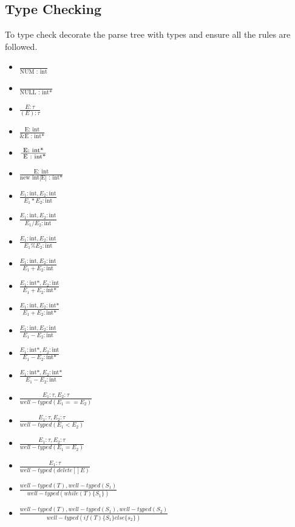 \documentclass{article}
\begin{document}
\subsection*{Type Checking}
To type check decorate the parse tree with types and ensure all the rules are followed. 
\begin{itemize}
\item \(\frac{}{\text{NUM : int}}\)
\item \(\frac{}{\text{NULL : int*}}\)
\item \(\frac{E : \tau}{(E) : \tau}\)
\item \(\frac{\text{E: int}}{\text{\& E : int*}}\)
\item \(\frac{\text{E: int*}}{\text{\* E : int*}}\)
\item \(\frac{\text{E: int}}{\text{new int[E] : int*}}\)
\item \(\frac{E_1 : \text{int}, E_2 : \text{int}}{E_1 * E_2 : \text{int}}\)
\item \(\frac{E_1 : \text{int}, E_2 : \text{int}}{E_1 / E_2 : \text{int}}\)
\item \(\frac{E_1 : \text{int}, E_2 : \text{int}}{E_1 \% E_2 : \text{int}}\)
\item \(\frac{E_1 : \text{int}, E_2 : \text{int}}{E_1 + E_2 : \text{int}}\)
\item \(\frac{E_1 : \text{int*}, E_2 : \text{int}}{E_1 + E_2 : \text{int*}}\)
\item \(\frac{E_1 : \text{int}, E_2 : \text{int*}}{E_1 + E_2 : \text{int*}}\)

\item \(\frac{E_1 : \text{int}, E_2 : \text{int}}{E_1 - E_2 : \text{int}}\)
\item \(\frac{E_1 : \text{int*}, E_2 : \text{int}}{E_1 - E_2 : \text{int*}}\)
\item \(\frac{E_1 : \text{int*}, E_2 : \text{int*}}{E_1 - E_2 : \text{int}}\)

\item \(\frac{E_1 : \tau, E_2 : \tau}{well-typed(E_1 ==  E_2)}\)
\item \(\frac{E_1 : \tau, E_2 : \tau}{well-typed(E_1 <  E_2)}\)
\item \(\frac{E_1 : \tau, E_2 : \tau}{well-typed(E_1 =  E_2)}\)
\item \(\frac{E_1 : \tau}{well-typed(delete [] E)}\)

\item \(\frac{well-typed(T) , well-typed(S_1)}{well-typed(while(T) \{S_1\})}\)
\item \(\frac{well-typed(T) , well-typed(S_1), well-typed(S_2)}{well-typed(if (T) \{S_1\} else \{s_2\})}\)
\end{itemize}
\end{document}
